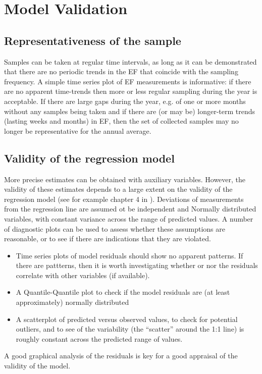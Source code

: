 \clearpage
\section{Model Validation}\label{Validation}

\subsection{Representativeness of the sample}

Samples can be taken at regular time intervals, as long as it can be demonstrated that there are no periodic trends in the EF that coincide with the sampling frequency. A simple time series plot of EF measurements is informative: if there are no apparent time-trends then more or less regular sampling during the year is acceptable. If there are large gaps during the year, e.g. of one or more months without any samples being taken and if there are (or may be) longer-term trends (lasting weeks and months) in EF, then the set of collected samples may no longer be representative for the annual average.

\subsection{Validity of the regression model}
More precise estimates can be obtained with auxiliary variables. However, the validity of these estimates depends to a large extent on the validity of the regression model (see for example chapter 4 in \cite{vanZanten}). Deviations of measurements from the regression line are assumed ot be independent and Normally distributed variables, with constant variance across the range of predicted values. A number of diagnostic plots can be used to assess whether these assumptions are reasonable, or to see if there are indications that they are violated.
\begin{itemize}
	\item Time series plots of model residuals should show no apparent patterns. If there are pattterns, then it is worth investigating whether or nor the residuals correlate with other variables (if available).
	\item A Quantile-Quantile plot to check if the model residuals are (at least approximately) normally distributed
	\item A scatterplot of predicted versus observed values, to check for potential outliers, and to see of the variability (the ``scatter'' around the 1:1 line) is roughly constant across the predicted range of values.
\end{itemize}

A good graphical analysis of the residuals is key for a good appraisal of the validity of the model.